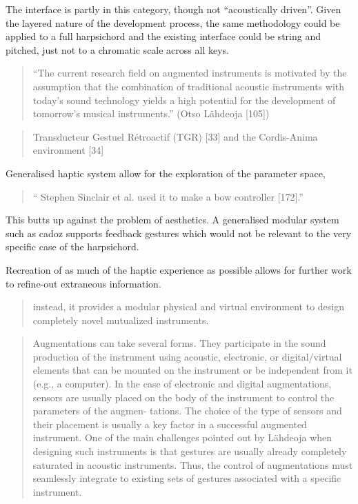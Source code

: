 The interface is partly in this category, though not ``acoustically driven''.
Given the layered nature of the development process, the same methodology could
be applied to a full harpsichord and the existing interface could be string and
pitched, just not to a chromatic scale across all keys. 

\begin{quotation}
    “The current research field on augmented instruments is motivated by the
    assumption that the combination of traditional acoustic instruments with
    today’s sound technology yields a high potential for the development of
    tomorrow’s musical instruments.” (Otso Lähdeoja [105])
\end{quotation}

\begin{quotation}
    Transducteur Gestuel Rétroactif (TGR) [33] and the Cordis-Anima environment
    [34]
\end{quotation}

Generalised haptic system allow for the exploration of the parameter space, 

\begin{quotation}
`` Stephen Sinclair et al. used it to make a bow controller [172].''
\end{quotation}

This butts up against the problem of aesthetics. A generalised modular system
such as cadoz supports feedback gestures which would not be relevant to the very
specific case of the harpsichord.

Recreation of as much of the haptic experience as possible allows for further
work to refine-out extraneous information.

\begin{quotation}
    instead, it provides a modular physical and virtual environment to design
    completely novel mutualized instruments.
\end{quotation}


\begin{quotation}
    Augmentations can take several forms. They participate in the sound
    production of the instrument using acoustic, electronic, or digital/virtual
    elements that can be mounted on the instrument or be independent from it
    (e.g., a computer). In the case of electronic and digital augmentations,
    sensors are usually placed on the body of the instrument to control the
    parameters of the augmen- tations. The choice of the type of sensors and
    their placement is usually a key factor in a successful augmented
    instrument. One of the main challenges pointed out by Lähdeoja when
    designing such instruments is that gestures are usually already completely
    saturated in acoustic instruments. Thus, the control of augmentations must
    seamlessly integrate to existing sets of gestures associated with a specific
    instrument.
\end{quotation}


